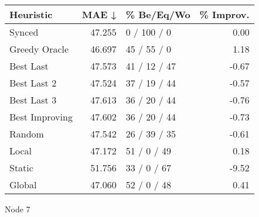 \begin{tabular}{lrlr}
\toprule
\textbf{Heuristic} & \textbf{MAE ↓} & \textbf{\% Be/Eq/Wo} & \textbf{\% Improv.} \\
\midrule
            Synced &         47.255 &          0 / 100 / 0 &                0.00 \\
     Greedy Oracle &         46.697 &          45 / 55 / 0 &                1.18 \\
         Best Last &         47.573 &         41 / 12 / 47 &               -0.67 \\
       Best Last 2 &         47.524 &         37 / 19 / 44 &               -0.57 \\
       Best Last 3 &         47.613 &         36 / 20 / 44 &               -0.76 \\
    Best Improving &         47.602 &         36 / 20 / 44 &               -0.73 \\
            Random &         47.542 &         26 / 39 / 35 &               -0.61 \\
             Local &         47.172 &          51 / 0 / 49 &                0.18 \\
            Static &         51.756 &          33 / 0 / 67 &               -9.52 \\
            Global &         47.060 &          52 / 0 / 48 &                0.41 \\
\bottomrule
\end{tabular}
\caption{Node 7}
\label{tab:iid_lr05_le1_bs2_7}
